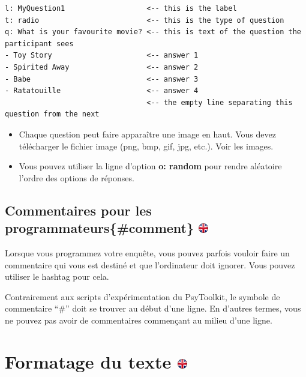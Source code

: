 \documentclass[
]{book}
\providecommand{\tightlist}{%
  \setlength{\itemsep}{0pt}\setlength{\parskip}{0pt}}
\begin{document}
\begin{verbatim}
l: MyQuestion1                   <-- this is the label
t: radio                         <-- this is the type of question
q: What is your favourite movie? <-- this is text of the question the participant sees
- Toy Story                      <-- answer 1
- Spirited Away                  <-- answer 2
- Babe                           <-- answer 3
- Ratatouille                    <-- answer 4
                                 <-- the empty line separating this question from the next
\end{verbatim}

\begin{itemize}
\tightlist
\item
  Chaque question peut faire apparaître une image en haut. Vous devez télécharger le fichier image (png, bmp, gif, jpg, etc.). Voir les images.
\item
  Vous pouvez utiliser la ligne d'option \textbf{o: random} pour rendre aléatoire l'ordre des options de réponses.
\end{itemize}

\hypertarget{commentaires-pour-les-programmateurscomment}{%
\subsection[Commentaires pour les programmateurs\{\#comment\} ]{\texorpdfstring{Commentaires pour les programmateurs\{\#comment\} \href{https://www.psytoolkit.org/doc3.4.0/online-survey-syntax.html\#questionstructure}{\protect\includegraphics{img/ukflag.png}}}{Commentaires pour les programmateurs\{\#comment\} }}\label{commentaires-pour-les-programmateurscomment}}

Lorsque vous programmez votre enquête, vous pouvez parfois vouloir faire un commentaire qui vous est destiné et que l'ordinateur doit ignorer. Vous pouvez utiliser le hashtag pour cela.

Contrairement aux scripts d'expérimentation du PsyToolkit, le symbole de commentaire ``\#'' doit se trouver au début d'une ligne. En d'autres termes, vous ne pouvez pas avoir de commentaires commençant au milieu d'une ligne.

\hypertarget{formatage-du-texte}{%
\section[Formatage du texte ]{\texorpdfstring{Formatage du texte \href{https://www.psytoolkit.org/doc3.4.0/online-survey-syntax.html\#Comments}{\protect\includegraphics{img/ukflag.png}}}{Formatage du texte }}\label{formatage-du-texte}}
\end{document}
